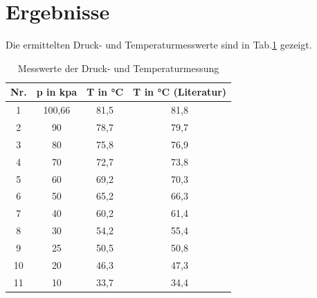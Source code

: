 \newpage
\section{Ergebnisse}
\label{sec:ergebnisse}
Die ermittelten Druck- und Temperaturmesswerte sind in Tab.\ref{tabmesswerte} gezeigt.
\begin{table}[h!]
	\centering
	\renewcommand*{\arraystretch}{1.2}
	\caption{Messwerte der Druck- und Temperaturmessung}
	\begin{tabular}{c|c|c|c}
		\hline
		\multicolumn{1}{l}{Nr.} & \multicolumn{1}{l}{p in kpa} & \multicolumn{1}{l}{T in °C} & \multicolumn{1}{l}{T in °C (Literatur)} \\
		\hline
		1     & 100,66 & 81,5  & 81,8 \\
		2     & 90    & 78,7  & 79,7 \\
		3     & 80    & 75,8  & 76,9 \\
		4     & 70    & 72,7  & 73,8 \\
		5     & 60    & 69,2  & 70,3 \\
		6     & 50    & 65,2  & 66,3 \\
		7     & 40    & 60,2  & 61,4 \\
		8     & 30    & 54,2  & 55,4 \\
		9     & 25    & 50,5  & 50,8 \\
		10    & 20    & 46,3  & 47,3 \\
		11    & 10    & 33,7  & 34,4 \\
	\end{tabular}%
	\label{tabmesswerte}%
\end{table}%

